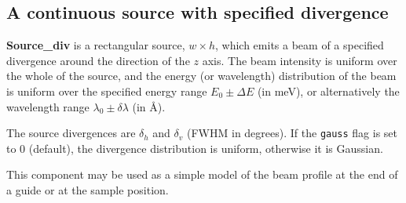 \subsection*{A continuous source with specified divergence}
\label{source-div}


\textbf{Source\_div} is a rectangular source, $w \times h$, which emits a
beam of a specified divergence around the direction of the $z$ axis.
The beam intensity is uniform over
the whole of the source, and the energy (or wavelength) distribution
of the beam is uniform over the specified energy range
$E_0 \pm \Delta E$ (in meV), or alternatively
the wavelength range $\lambda_0 \pm \delta\lambda$ (in \AA ).

The source divergences are $\delta_h$ and $\delta_v$ (FWHM in degrees).
If the \verb+gauss+ flag is set to 0 (default),
the divergence distribution is uniform, otherwise it is Gaussian.

This component may be used as a simple model of the
beam profile at the end of a guide or at the sample position.

